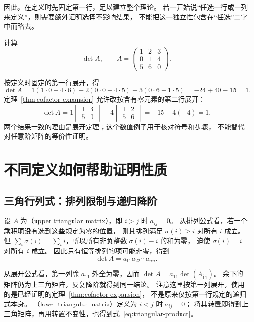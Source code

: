 \documentclass[UTF8,12pt,a4paper,fontset=fandol]{ctexart}
\begin{document}
因此，在定义时先固定第一行，足以建立整个理论。
若一开始说“任选一行或一列来定义”，则需要额外证明选择不影响结果，
不能把这一独立性包含在“任选”二字中而略去。

\begin{example}[不同展开位置给出相同结果]
计算
\[
  \det A,\qquad
  A=\begin{pmatrix}1&2&3\\0&1&4\\5&6&0\end{pmatrix}.
\]
\end{example}

\begin{solve}
按定义时固定的第一行展开，得
\[
  \det A
  =1(1\cdot0-4\cdot6)
   -2(0\cdot0-4\cdot5)
   +3(0\cdot6-1\cdot5)
  =-24+40-15=1.
\]
定理~\ref{thm:cofactor-expansion} 允许改按含有零元素的第二行展开：
\[
  \det A
  =1\begin{vmatrix}1&3\\5&0\end{vmatrix}
   -4\begin{vmatrix}1&2\\5&6\end{vmatrix}
  =-15-4(-4)=1.
\]
两个结果一致的理由是展开定理；这个数值例子用于核对符号和步骤，
不能替代对任意阶矩阵的等价性证明。
\end{solve}

\section{不同定义如何帮助证明性质}
\label{sec:using-definitions}

\subsection{三角行列式：排列限制与递归降阶}

设 $A$ 为（upper triangular matrix），即 $i>j$ 时 $a_{ij}=0$。
从排列公式看，若一个乘积项没有选到这些规定为零的位置，
则其排列满足 $\sigma(i)\geq i$ 对所有 $i$ 成立。
但 $\sum_i\sigma(i)=\sum_i i$，所以所有非负整数 $\sigma(i)-i$ 的和为零，
迫使 $\sigma(i)=i$ 对所有 $i$ 成立。
因此只有恒等排列的项可能非零，得到
\begin{equation}
  \det A=a_{11}a_{22}\cdots a_{nn}.
  \label{eq:triangular-product}
\end{equation}

从展开公式看，第一列除 $a_{11}$ 外全为零，因而
$\det A=a_{11}\det(A_{\widehat1\widehat1})$。
余下的矩阵仍为上三角矩阵，反复降阶就得到同一结论。
注意这里按第一列展开，使用的是已经证明的定理~\ref{thm:cofactor-expansion}，
不是原来仅按第一行规定的递归式本身。
（lower triangular matrix）定义为 $i<j$ 时 $a_{ij}=0$；
将其转置即得到上三角矩阵，再用转置不变性，也得到式~\eqref{eq:triangular-product}。
\end{document}
